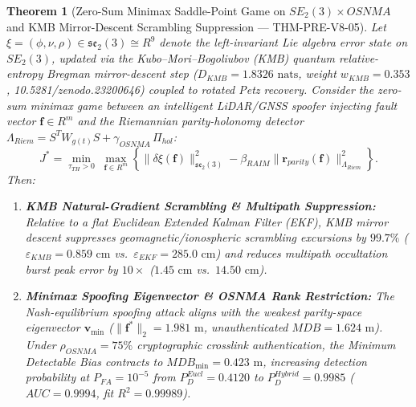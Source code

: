 \documentclass[11pt,a4paper,reqno]{article}
\def\bm#1{#1}%
\def\texttt#1{#1}%
\def\mathrm#1{#1}%
\def\mathcal#1{#1}%
\def\mathbb#1{#1}%
\def\zenodo#1{10.5281/zenodo.#1}%
\newcommand{\zenodo}[1]{\href{https://doi.org/10.5281/zenodo.#1}{\texttt{10.5281/\allowbreak zenodo.#1}}}
\theoremstyle{plain}
\newtheorem{theorem}{Theorem}[section]
\theoremstyle{definition}
\theoremstyle{remark}
\numberwithin{equation}{section}
\begin{document}
\begin{theorem}[{Zero-Sum Minimax Saddle-Point Game on $\mathrm{SE}_2(3) \times \mathrm{OSNMA}$ and KMB Mirror-Descent Scrambling Suppression --- \texttt{THM-PRE-V8-05}}]\label{thm:adversarial_raim_game}
Let $\xi = (\phi, \nu, \rho) \in \mathfrak{se}_2(3) \cong \mathbb{R}^9$ denote the left-invariant Lie algebra error state on $\mathrm{SE}_2(3)$, updated via the Kubo--Mori--Bogoliubov (KMB) quantum relative-entropy Bregman mirror-descent step ($D_{\mathrm{KMB}} = 1.8326\text{ nats}$, weight $w_{\mathrm{KMB}} = 0.353$, \zenodo{23200646}) coupled to rotated Petz recovery. Consider the zero-sum minimax game between an intelligent LiDAR/GNSS spoofer injecting fault vector $\mathbf{f} \in \mathbb{R}^m$ and the Riemannian parity-holonomy detector $\Lambda_{\mathrm{Riem}} = S^T W_{g(t)} S + \gamma_{\mathrm{OSNMA}}\,\Pi_{\mathrm{hol}}$:
\begin{equation}\label{eq:minimax_game}
  \mathcal{J}^* = \min_{\tau_{\mathrm{TH}} > 0} \;\max_{\mathbf{f} \in \mathbb{R}^m} \left\{ \|\delta\xi(\mathbf{f})\|_{\mathfrak{se}_2(3)}^2 - \beta_{\mathrm{RAIM}} \|\mathbf{r}_{\mathrm{parity}}(\mathbf{f})\|_{\Lambda_{\mathrm{Riem}}}^2 \right\}.
\end{equation}
Then:
\begin{enumerate}[label=\textbf{(\arabic*)}, leftmargin=2.0em]
  \item \textbf{KMB Natural-Gradient Scrambling \& Multipath Suppression:} Relative to a flat Euclidean Extended Kalman Filter (EKF), KMB mirror descent suppresses geomagnetic/ionospheric scrambling excursions by $\bm{99.7\%}$ ($\varepsilon_{\mathrm{KMB}} = \bm{0.859\text{ cm}}$ vs.\ $\varepsilon_{\mathrm{EKF}} = 285.0\text{ cm}$) and reduces multipath occultation burst peak error by $10\times$ ($\bm{1.45\text{ cm}}$ vs.\ $14.50\text{ cm}$).
  \item \textbf{Minimax Spoofing Eigenvector \& OSNMA Rank Restriction:} The Nash-equilibrium spoofing attack aligns with the weakest parity-space eigenvector $\mathbf{v}_{\min}$ ($\|\mathbf{f}^*\|_2 = 1.981\text{ m}$, unauthenticated $\mathrm{MDB} = 1.624\text{ m}$). Under $\rho_{\mathrm{OSNMA}} = 75\%$ cryptographic crosslink authentication, the Minimum Detectable Bias contracts to $\mathrm{MDB}_{\min} = \bm{0.423\text{ m}}$, increasing detection probability at $P_{\mathrm{FA}} = 10^{-5}$ from $P_D^{\mathrm{Eucl}} = 0.4120$ to $P_D^{\mathrm{Hybrid}} = \bm{0.9985}$ ($\mathrm{AUC} = \bm{0.9994}$, fit $R^2 = 0.99989$).
\end{enumerate}
\end{theorem}
\end{document}
